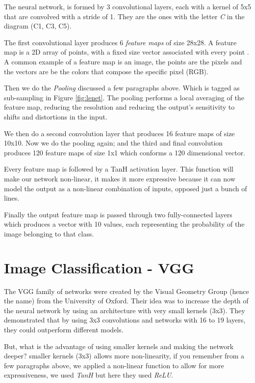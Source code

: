 \documentclass[10pt, twocolumn]{article}
\begin{document}
The neural network, is formed by 3 convolutional layers, each with a kernel of
5x5 that are convolved with a stride of 1. They are the ones with the letter
\emph{C} in the diagram (C1, C3, C5).

The first convolutional layer produces 6 \emph{feature maps} of size 28x28. A
feature map is a 2D array of points, with a fixed size vector associated with
every point \cite{mathdl}. A common example of a feature map is an image, the
points are the pixels and the vectors are be the colors that compose the
specific pixel (RGB).

Then we do the \emph{Pooling} discussed a few paragraphs above. Which is tagged
as sub-sampling in Figure \ref{fig:lenet}. The pooling performs a local
averaging of the feature map, reducing the resolution and reducing the output's
sensitivity to shifts and distortions in the input.

We then do a second convolution layer that produces 16 feature maps of size
10x10. Now we do the pooling again; and the third and final convolution
produces 120 feature maps of size 1x1 which conforms a 120 dimensional vector.

Every feature map is followed by a TanH activation layer. This function will
make our network non-linear, it makes it more expressive because it can now
model the output as a non-linear combination of inputs, opposed just a bunch of
lines.

Finally the output feature map is passed through two fully-connected layers
which produces a vector with 10 values, each representing the probability of
the image belonging to that class.

\section{Image Classification - VGG}

The VGG family of networks were created by the Visual Geometry Group (hence
the name) from the University of Oxford. Their idea was to increase the depth
of the neural network by using an architecture with very small kernels (3x3).
They demonstrated that by using 3x3 convolutions and networks with 16 to 19
layers, they could outperform different models. \cite{vgg}

But, what is the advantage of using smaller kernels and making the network
deeper?  smaller kernels (3x3) allows more non-linearity, if you remember from a
few paragraphs above, we applied a non-linear function to allow for more
expressiveness, we used \emph{TanH} but here they used \emph{ReLU}.
\end{document}
